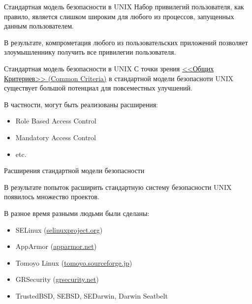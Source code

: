 \documentclass{beamer}
\begin{document}
\begin{frame}[fragile]{Стандартная модель безопасности в UNIX}
Набор привилегий пользователя, как правило, является слишком
широким для любого из процессов, запущенных данным пользователем.

\bigskip

В результате, компрометация любого из пользовательских приложений
позволяет злоумышленнику получить все привилегии пользователя.
\begin{center}
\end{center}
\end{frame}

\begin{frame}[fragile]{Стандартная модель безопасности в UNIX}
С точки зрения \href{http://en.wikipedia.org/wiki/Common\_Criteria}{<<Общих Критериев>> (Common Criteria)}
в стандартной модели безопасноти UNIX существует большой потенциал для повсеместных
улучшений.

\begin{block}{В частности, могут быть реализованы расширения:}
\begin{itemize}
\item Role Based Access Control
\item Mandatory Access Control
\item etc.
\end{itemize}
\end{block}

\end{frame}

\begin{frame}[fragile]{Расширения стандартной модели безопасности}

В результате попыток расширить стандартную систему безопасности UNIX
появилось множество проектов.

\begin{block}{В разное время разными людьми были сделаны:}

\begin{itemize}
\item SELinux (\href{http://selinuxproject.org}{selinuxproject.org})
\item AppArmor (\href{http://wiki.apparmor.net/index.php/Main\_Page}{apparmor.net})
\item Tomoyo Linux (\href{http://tomoyo.sourceforge.jp/}{tomoyo.sourceforge.jp})
\item GRSecurity (\href{http://grsecurity.net/}{grsecurity.net})
\item TrustedBSD, SEBSD, SEDarwin, Darwin Seatbelt
\end{itemize}
\end{block}

\end{frame}
\end{document}
